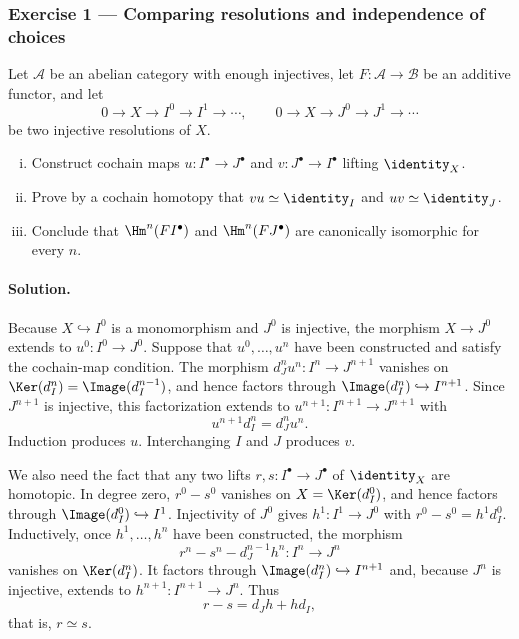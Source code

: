 \subsubsection*{Exercise 1 --- Comparing resolutions and independence of choices}
\hypertarget{o014.mastery.derived-spectral.002.ex01}{ }
\label{mastery:derived-spectral-002-ex01}

Let $\mathcal{A}$ be an abelian category with enough injectives, let
$F:\mathcal{A}\to\mathcal{B}$ be an additive functor, and let
\[
	0\to X\to I^0\to I^1\to\cdots,
	\qquad
	0\to X\to J^0\to J^1\to\cdots
\]
be two injective resolutions of $X$.
\begin{enumerate}[(i)]
	\item Construct cochain maps $u:I^\bullet\to J^\bullet$ and
	$v:J^\bullet\to I^\bullet$ lifting $\identity_X$.
	\item Prove by a cochain homotopy that $vu\simeq\identity_I$ and
	$uv\simeq\identity_J$.
	\item Conclude that $\Hm^n(FI^\bullet)$ and
	$\Hm^n(FJ^\bullet)$ are canonically isomorphic for every $n$.
\end{enumerate}

\paragraph{Solution.}
\hypertarget{o014.mastery.derived-spectral.002.sol01}{ }
Because $X\hookrightarrow I^0$ is a monomorphism and $J^0$ is injective,
the morphism $X\to J^0$ extends to $u^0:I^0\to J^0$. Suppose that
$u^0,\ldots,u^n$ have been constructed and satisfy the cochain-map
condition. The morphism $d_J^nu^n:I^n\to J^{n+1}$ vanishes on
$\Ker(d_I^n)=\Image(d_I^{n-1})$, and hence factors through
$\Image(d_I^n)\hookrightarrow I^{n+1}$. Since $J^{n+1}$ is injective,
this factorization extends to $u^{n+1}:I^{n+1}\to J^{n+1}$ with
\[
	u^{n+1}d_I^n=d_J^nu^n.
\]
Induction produces $u$. Interchanging $I$ and $J$ produces $v$.

We also need the fact that any two lifts $r,s:I^\bullet\to J^\bullet$ of
$\identity_X$ are homotopic. In degree zero, $r^0-s^0$ vanishes on
$X=\Ker(d_I^0)$, and hence factors through
$\Image(d_I^0)\hookrightarrow I^1$. Injectivity of $J^0$ gives
$h^1:I^1\to J^0$ with
$r^0-s^0=h^1d_I^0$. Inductively, once $h^1,\ldots,h^n$ have been
constructed, the morphism
\[
	r^n-s^n-d_J^{n-1}h^n:I^n\longrightarrow J^n
\]
vanishes on $\Ker(d_I^n)$. It factors through
$\Image(d_I^n)\hookrightarrow I^{n+1}$ and, because $J^n$ is injective,
extends to $h^{n+1}:I^{n+1}\to J^n$. Thus
\[
	r-s=d_Jh+hd_I,
\]
that is, $r\simeq s$.

